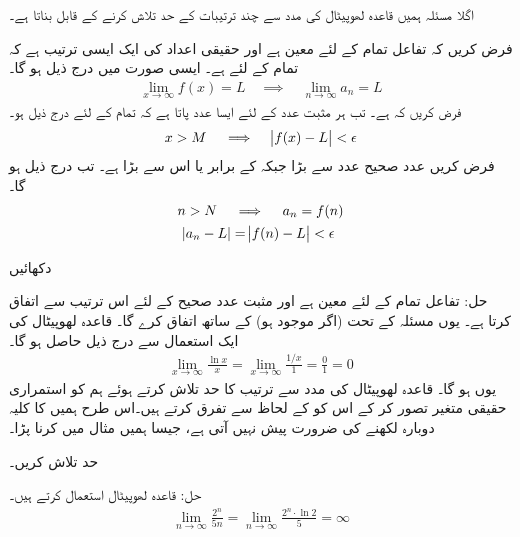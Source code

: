 اگلا مسئلہ ہمیں قاعدہ لھوپیٹال کی مدد سے چند ترتیبات کے حد تلاش کرنے کے قابل بناتا ہے۔

فرض کریں کہ تفاعل  تمام  کے لئے معین ہے اور  حقیقی اعداد کی ایک ایسی ترتیب ہے کہ تمام  کے لئے  ہے۔ ایسی صورت میں درج ذیل ہو گا۔
\begin{align*}
\lim_{x\to\infty}f(x)=L\quad \implies\quad \lim_{n\to \infty}a_n=L
\end{align*}  
فرض کریں کہ  ہے۔ تب ہر مثبت عدد  کے لئے ایسا عدد  پاتا ہے کہ تمام  کے لئے درج ذیل ہو۔
\begin{align*}
x>M\quad\implies \quad \abs{f(x)-L}<\epsilon
\end{align*}
فرض کریں عدد صحیح  عدد  سے بڑا جبکہ  کے برابر یا اس سے بڑا ہے۔ تب درج ذیل ہو گا۔
\begin{align*}
n>N\quad &\implies \quad a_n=f(n)\\
\abs{a_n-L}&=\abs{f(n)-L}<\epsilon
\end{align*}

دکھائیں 

حل:\quad
تفاعل  تمام  کے لئے معین ہے اور مثبت عدد صحیح کے لئے اس ترتیب سے اتفاق کرتا ہے۔ یوں  مسئلہ  کے تحت  (اگر موجود ہو) کے ساتھ اتفاق کرے گا۔ قاعدہ لھوپیٹال کی ایک استعمال سے درج ذیل حاصل ہو گا۔
\begin{align*}
\lim_{x\to \infty}\frac{\ln x}{x}=\lim_{x\to\infty}\frac{1/x}{1}=\frac{0}{1}=0
\end{align*}  
یوں  ہو گا۔
قاعدہ لھوپیٹال کی مدد سے ترتیب کا حد تلاش کرتے ہوئے ہم  کو استمراری حقیقی متغیر تصور کر کے اس کو  کے لحاظ سے تفرق کرتے ہیں۔اس طرح ہمیں  کا کلیہ دوبارہ لکھنے کی ضرورت پیش نہیں آتی ہے، جیسا ہمیں مثال  میں کرنا پڑا۔

حد  تلاش کریں۔

حل:\quad
قاعدہ لھوپیٹال استعمال کرتے ہیں۔
\begin{align*}
\lim_{n\to\infty}\frac{2^n}{5n}=\lim_{n\to \infty}\frac{2^n\cdot \ln 2}{5}=\infty
\end{align*}


